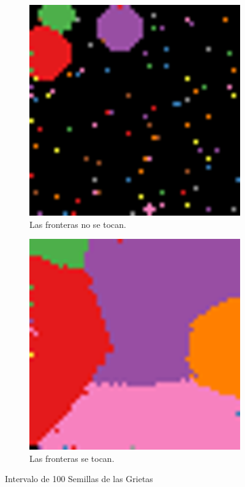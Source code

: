 \documentclass{article}
\begin{document}
\begin{figure}
     \centering
     \begin{subfigure}[b]{0.40\textwidth}
         \centering
         \includegraphics[width=\textwidth]{ciclo_5.png}
         \caption{Las fronteras no se tocan.}
         \label{fig:notocan}
     \end{subfigure}
     \begin{subfigure}[b]{0.40\textwidth}
         \centering
         \includegraphics[width=\textwidth]{ciclo_30.png}
         \caption{Las fronteras se tocan.}
         \label{fig:tocan}
     \end{subfigure}
     \caption{Intervalo de 100 Semillas de las Grietas}
      \label{semilla}
\end{figure}
\newpage




\cite{Matpltlib}
\end{document}
